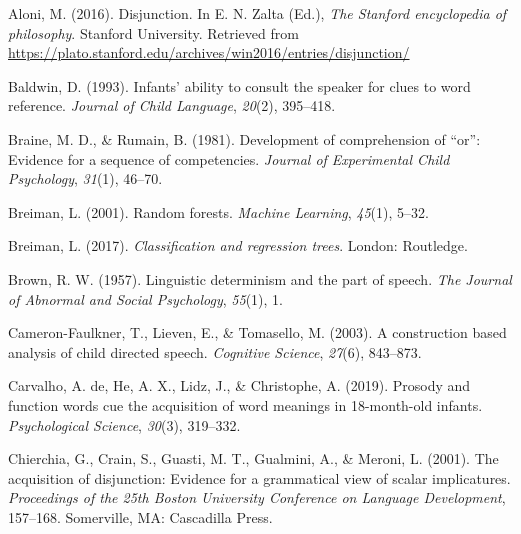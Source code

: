 \documentclass[
  ,man,floatsintext]{apa6}
\newlength{\cslhangindent}
\newlength{\cslentryspacingunit} %
\newenvironment{CSLReferences}[2] %
 {%
  \setlength{\parindent}{0pt}
  \ifodd #1
  \let\oldpar\par
  \def\par{\hangindent=\cslhangindent\oldpar}
  \fi
  \setlength{\parskip}{#2\cslentryspacingunit}
 }%
 {}
\begin{document}
\setlength{\parindent}{-0.5in}
\setlength{\leftskip}{0.5in}

\hypertarget{refs}{}
\begin{CSLReferences}{1}{0}
\leavevmode{}%
Aloni, M. (2016). Disjunction. In E. N. Zalta (Ed.), \emph{The {S}tanford encyclopedia of philosophy}. Stanford University. Retrieved from \url{https://plato.stanford.edu/archives/win2016/entries/disjunction/}

\leavevmode{}%
Baldwin, D. (1993). Infants' ability to consult the speaker for clues to word reference. \emph{Journal of Child Language}, \emph{20}(2), 395--418.

\leavevmode{}%
Braine, M. D., \& Rumain, B. (1981). Development of comprehension of {``or''}: Evidence for a sequence of competencies. \emph{Journal of Experimental Child Psychology}, \emph{31}(1), 46--70.

\leavevmode{}%
Breiman, L. (2001). Random forests. \emph{Machine Learning}, \emph{45}(1), 5--32.

\leavevmode{}%
Breiman, L. (2017). \emph{Classification and regression trees}. London: Routledge.

\leavevmode{}%
Brown, R. W. (1957). Linguistic determinism and the part of speech. \emph{The Journal of Abnormal and Social Psychology}, \emph{55}(1), 1.

\leavevmode{}%
Cameron-Faulkner, T., Lieven, E., \& Tomasello, M. (2003). A construction based analysis of child directed speech. \emph{Cognitive Science}, \emph{27}(6), 843--873.

\leavevmode{}%
Carvalho, A. de, He, A. X., Lidz, J., \& Christophe, A. (2019). Prosody and function words cue the acquisition of word meanings in 18-month-old infants. \emph{Psychological Science}, \emph{30}(3), 319--332.

\leavevmode{}%
Chierchia, G., Crain, S., Guasti, M. T., Gualmini, A., \& Meroni, L. (2001). The acquisition of disjunction: Evidence for a grammatical view of scalar implicatures. \emph{Proceedings of the 25th {B}oston {U}niversity Conference on Language Development}, 157--168. Somerville, MA: Cascadilla Press.


\end{CSLReferences}
\end{document}
